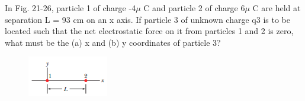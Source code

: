 \documentclass[11pt]{exam}
\begin{document}
\begin{questions}
\addpoints
\question[10] In Fig. 21-26, particle 1 of charge -4$\mu$ C and particle  2 of charge 6$\mu$ C are held at separation L = 93 cm on an x axis. If particle 3 of unknown charge q3 is to be located such that the net electrostatic force on it from particles 1 and 2 is zero, what must be the (a) x and (b) y coordinates of particle 3?\begin{figure}[H]
\centering
\includegraphics[scale=0.8]{assets/Halliday_ch21p13.png}
\end{figure}
\newpage





\end{questions}
\end{document}
